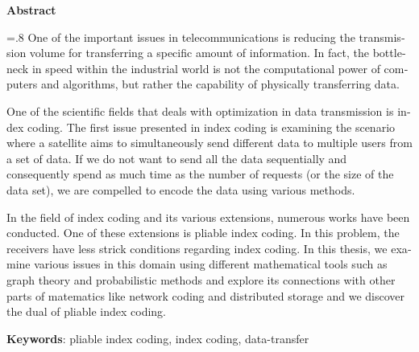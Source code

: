 


\pagestyle{empty}

\begin{latin}

\begin{center}
\textbf{Abstract}
\end{center}
\baselineskip=.8\baselineskip
One of the important issues in telecommunications is reducing the transmission volume for transferring a specific amount of information. In fact, the bottleneck in speed within the industrial world is not the computational power of computers and algorithms, but rather the capability of physically transferring data.

One of the scientific fields that deals with optimization in data transmission is index coding. The first issue presented in index coding is examining the scenario where a satellite aims to simultaneously send different data to multiple users from a set of data. If we do not want to send all the data sequentially and consequently spend as much time as the number of requests (or the size of the data set), we are compelled to encode the data using various methods.

In the field of index coding and its various extensions, numerous works have been conducted. One of these extensions is pliable index coding. In this problem, the receivers have less strick conditions regarding index coding. In this thesis, we examine various issues in this domain using different mathematical tools such as graph theory and probabilistic methods and explore its connections with other parts of matematics like network coding and distributed storage and we discover the dual of pliable index coding.

\bigskip\noindent\textbf{Keywords}:
pliable index coding, index coding, data-transfer 

\end{latin}
